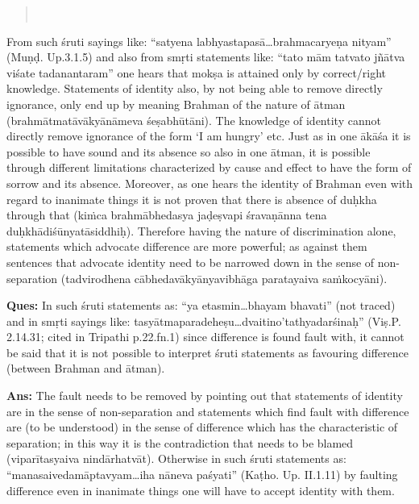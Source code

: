 \begin{verse}
\\
\end{verse}

From such śruti sayings like: “satyena labhyastapasā…brahmacaryeṇa nityam” (Muṇḍ. Up.3.1.5) and also from smṛti statements like: “tato mām tatvato jñātva viśate tadanantaram” one hears that mokṣa is attained only by correct/right knowledge. Statements of identity also, by not being able to remove directly ignorance, only end up by meaning Brahman of the nature of ātman (brahmātmatāvākyānāmeva śeṣabhūtāni). The knowledge of identity cannot directly remove ignorance of the form ‘I am hungry’ etc. Just as in one ākāśa it is possible to have sound and its absence so also in one ātman, it is possible through different limitations characterized by cause and effect to have the form of sorrow and its absence. Moreover, as one hears the identity of Brahman even with regard to inanimate things it is not proven that there is absence of duḥkha through that (kiṁca brahmābhedasya jaḍeṣvapi śravaṇānna tena duḥkhādiśūnyatāsiddhiḥ). Therefore  having the nature of discrimination alone, statements which advocate difference are more powerful; as against them sentences that advocate identity need to be narrowed down in the sense of non-separation (tadvirodhena cābhedavākyānyavibhāga paratayaiva saṁkocyāni).

\textbf{Ques:} In such śruti statements as:  “ya etasmin…bhayam bhavati” (not traced) and in smṛti sayings like: tasyātmaparadeheṣu…dvaitino’ta\-thyadarśinaḥ” (Viṣ.P. 2.14.31; cited in Tripathi p.22.fn.1) since difference is found fault with, it cannot be said that it is not possible to interpret śruti statements as favouring difference (between Brahman and ātman).

\textbf{Ans:} The fault needs to be removed by pointing out that statements of identity are in the sense of non-separation and statements  which find fault with difference are (to be understood) in the sense of difference which has the characteristic  of separation; in this way it is the contradiction that needs to be blamed (viparītasyaiva nindārhatvāt). Otherwise in such śruti statements as: “manasaivedamāptavyam…iha nāneva paśyati” (Kaṭho. Up. II.1.11) by faulting difference even in inanimate things one will have to accept identity with them. 

